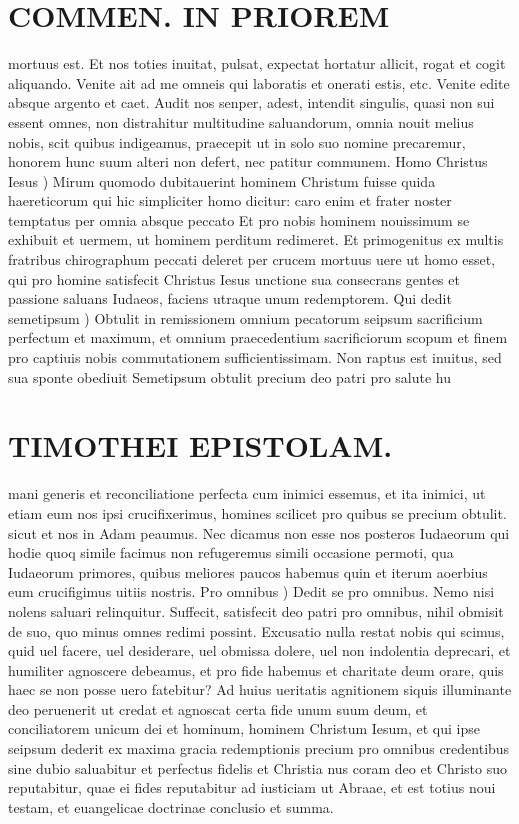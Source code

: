 \documentclass{article}
\begin{document}
\begin{pages}
\section*{COMMEN. IN PRIOREM }
\marginpar{[ p.50 ]}\pstart mortuus est. Et nos toties inuitat, pulsat, expectat hortatur allicit, rogat et cogit aliquando. Venite ait ad me omneis qui laboratis et onerati estis, etc. Venite edite absque argento et caet. Audit nos senper, adest, intendit singulis, quasi non sui essent omnes, non distrahitur multitudine saluandorum, omnia nouit melius nobis, scit quibus indigeamus, praecepit ut in solo suo nomine precaremur, honorem hunc suum alteri non defert, nec patitur communem.  \pend\pstart Homo Christus Iesus ) Mirum quomodo dubitauerint hominem Christum fuisse quida haereticorum qui hic simpliciter homo dicitur: caro enim et frater noster temptatus per omnia absque peccato Et pro nobis hominem nouissimum se exhibuit et uermem, ut hominem perditum redimeret. Et primogenitus ex multis fratribus chirographum peccati deleret per crucem mortuus uere ut homo esset, qui pro homine satisfecit Christus Iesus unctione sua consecrans gentes et passione saluans Iudaeos, faciens utraque unum redemptorem.  \pend\pstart Qui dedit semetipsum ) Obtulit in remissionem omnium pecatorum seipsum sacrificium perfectum et maximum, et omnium praecedentium sacrificiorum scopum et finem pro captiuis nobis commutationem sufficientissimam. Non raptus est inuitus, sed sua sponte obediuit Semetipsum obtulit precium deo patri pro salute hu\pend
\section*{TIMOTHEI EPISTOLAM. }
\marginpar{[ p.51 ]}\pstart mani generis et reconciliatione perfecta cum inimici essemus, et ita inimici, ut etiam eum nos ipsi crucifixerimus, homines scilicet pro quibus se precium obtulit. sicut et nos in Adam peaumus. Nec dicamus non esse nos posteros Iudaeorum qui hodie quoq simile facimus non refugeremus simili occasione permoti, qua Iudaeorum primores, quibus meliores paucos habemus quin et iterum aoerbius eum crucifigimus uitiis nostris.  \pend\pstart Pro omnibus ) Dedit se pro omnibus. Nemo nisi nolens saluari relinquitur. Suffecit, satisfecit deo patri pro omnibus, nihil obmisit de suo, quo minus omnes redimi possint. Excusatio nulla restat nobis qui scimus, quid uel facere, uel desiderare, uel obmissa dolere, uel non indolentia deprecari, et humiliter agnoscere debeamus, et pro fide habemus et charitate deum orare, quis haec se non posse uero fatebitur? Ad huius ueritatis agnitionem siquis illuminante deo peruenerit ut credat et agnoscat certa fide unum suum deum, et conciliatorem unicum dei et hominum, hominem Christum Iesum, et qui ipse seipsum dederit ex maxima gracia redemptionis precium pro omnibus credentibus sine dubio saluabitur et perfectus fidelis et Christia nus coram deo et Christo suo reputabitur, quae ei fides reputabitur ad iusticiam ut Abraae, et est totius noui testam, et euangelicae doctrinae conclusio et summa.  \pend

\end{pages}
\end{document}
